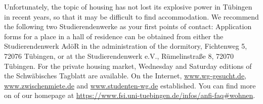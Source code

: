 Unfortunately, the topic of housing has not lost its explosive power in Tübingen in recent years,
so that it may be difficult to find accommodation. We recommend the following two Studierendenwerke as your first points of contact:
Application forms for a place in a hall of residence can be obtained from either the Studierendenwerk AdöR in the administration of the dormitory,
Fichtenweg 5, 72076 Tübingen, or at the Studierendenwerk e.V., Rümelinstraße 8, 72070 Tübingen. For the private housing market, Wednesday and Saturday
editions of the Schwäbisches Tagblatt are available.
On the Internet, \url{www.wg-gesucht.de}, \url{www.zwischenmiete.de} and \url{www.studenten-wg.de} established.
You can find more on of our homepage at \url{https://www.fsi.uni-tuebingen.de/infos/anfi-faq\#wohnen}.
\else

